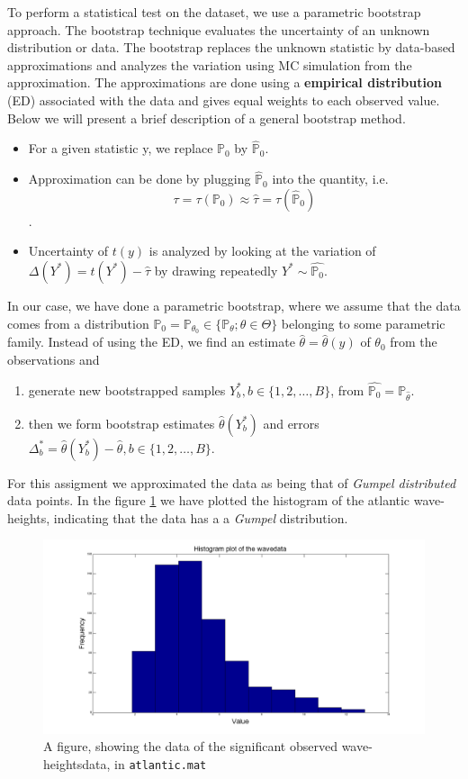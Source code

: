 To perform a statistical test on the dataset, we use a parametric bootstrap approach. The bootstrap technique evaluates the uncertainty of an unknown distribution or data. The bootstrap replaces the unknown statistic by data-based approximations and analyzes the variation using MC simulation from the approximation. The approximations are done using a \textbf{empirical distribution} (ED) associated with the data and gives equal weights to each observed value. Below we will present a brief description of a general bootstrap method.

\begin{itemize}
\item{For a given statistic y, we replace $\mathbb{P}_0$ by $\hat{\mathbb{P}}_0$.}
\item{Approximation can be done by plugging $\hat{\mathbb{P}}_0$ into the quantity, i.e.
\[ \tau=\tau(\mathbb{P}_0)\approx \hat{\tau}=\tau(\hat{\mathbb{P}}_0) \].}
\item{Uncertainty of $t(y)$ is analyzed by looking at the variation of $\Delta(Y^*)=t(Y^*)-\hat{\tau}$ by drawing repeatedly $Y^*\sim \hat{\mathbb{P}_0}$.}
\end{itemize}

In our case, we have done a parametric bootstrap, where we assume that the data comes from a distribution $\mathbb{P}_0=\mathbb{P}_{\theta_0}\in\{\mathbb{P}_\theta;\theta \in \Theta\}$ belonging to some parametric family. Instead of using the ED, we find an estimate $\hat{\theta}=\hat{\theta}(y)$ of $\theta_0$ from the observations and
\begin{enumerate}
\item{generate new bootstrapped samples $Y_b^*,b\in \{1,2,\dots,B\}$, from $\hat{\mathbb{P}_0}=\mathbb{P}_{\hat{\theta}}$.}
\item{then we form bootstrap estimates $\hat{\theta}(Y_b^*)$ and errors $\Delta_b^*=\hat{\theta}(Y_b^*)-\hat{\theta},b\in\{1,2,\dots,B\}$}.
\end{enumerate}

For this assigment we approximated the data as being that of \textit{Gumpel distributed} data points. In the figure \ref{fig:waveshist} we have plotted the histogram of the atlantic wave-heights, indicating that the data has a a \textit{Gumpel} distribution.

\begin{figure}[H]
\centering
	\includegraphics[scale=0.26]{./Figures/waveshist.png}
\caption{A figure, showing the data of the significant observed wave-heightsdata, in \texttt{atlantic.mat}}
\label{fig:waveshist}

\end{figure}
